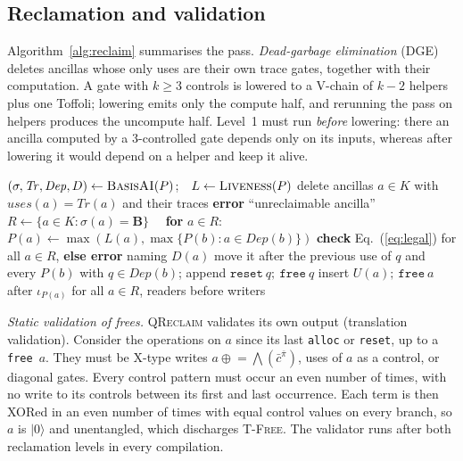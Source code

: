 \documentclass[conference,a4paper]{IEEEtran}
\newcommand{\QR}{\textup{\textsc{QReclaim}}}
\newcommand{\Dep}{\mathit{Dep}}
\newcommand{\Tr}{\mathit{Tr}}
\newcommand{\instr}[1]{\texttt{#1}}
\begin{document}
\subsection{Reclamation and validation}
\label{sec:reclaim}
Algorithm~\ref{alg:reclaim} summarises the pass. \emph{Dead-garbage elimination} (DGE) deletes ancillas whose only uses are their own trace gates, together with their computation. A gate with $k\ge3$ controls is lowered to a V-chain of $k{-}2$ helpers plus one Toffoli; lowering emits only the compute half, and rerunning the pass on helpers produces the uncompute half. Level~1 must run \emph{before} lowering: there an ancilla computed by a 3-controlled gate depends only on its inputs, whereas after lowering it would depend on a helper and keep it alive.

\begin{algorithm}[t]
\caption{\textsc{Reclaim}$(P,K)$, eager mode}
\label{alg:reclaim}
\footnotesize
\begin{algorithmic}[1]
\State $(\sigma,\Tr,\Dep,D)\gets\textsc{BasisAI}(P)$;\ \ $L\gets\textsc{Liveness}(P)$
\State delete ancillas $a\in K$ with $\mathit{uses}(a)=\Tr(a)$ and their traces 
 \textbf{error} ``unreclaimable ancilla'' \EndIf
\State $R\gets\{a\in K:\sigma(a)=\mathbf{B}\}$
\Repeat\ \ \textbf{for} $a\in R$: $P(a)\gets\max(L(a),\max\{P(b):a\in\Dep(b)\})$
\State \textbf{check} Eq.~(\ref{eq:legal}) for all $a\in R$, \textbf{else error} naming $D(a)$
\ForAll{$q$ whose final operation is $\instr{measure}$}
  \State move it after the previous use of $q$ and every $P(b)$ with $q\in\Dep(b)$; append $\instr{reset}\ q;\ \instr{free}\ q$
\EndFor
\State insert $U(a);\ \instr{free}\ a$ after $\iota_{P(a)}$ for all $a\in R$, readers before writers
\end{algorithmic}
\end{algorithm}

\emph{Static validation of frees.} \label{sec:validate}\QR{} validates its own output (translation validation). Consider the operations on $a$ since its last \instr{alloc} or \instr{reset}, up to a \instr{free}~$a$. They must be X-type writes $a\mathrel{\oplus}=\bigwedge(\bar c^{\bar\pi})$, uses of $a$ as a control, or diagonal gates. Every control pattern must occur an even number of times, with no write to its controls between its first and last occurrence. Each term is then XORed in an even number of times with equal control values on every branch, so $a$ is $|0\rangle$ and unentangled, which discharges \textsc{T-Free}. The validator runs after both reclamation levels in every compilation.
\end{document}

